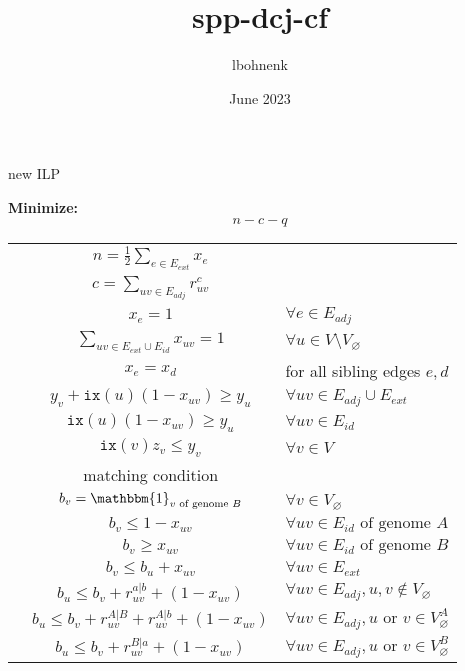 \documentclass{article}[7pt]
\title{spp-dcj-cf}
\author{lbohnenk }
\date{June 2023}
\begin{document}
\newcommand{\extremityedges}{E_{ext}}
\newcommand{\adjacencyedges}{E_{adj}}
\newcommand{\indeledges}{E_{id}}
\newcommand{\idx}[1]{\texttt{ix}(#1)}
\newcommand{\parityvar}{b}
\newcommand{\caps}{V_{\varnothing}}
\newcommand{\trans}{|}
\newcommand{\cis}{\circ}
\newcommand{\coolone}{\mathbbm{1}}

\begin{algorithm}[htb]
\caption{new ILP}
\textbf{Minimize:}
\begin{equation*}
    n - c -q
\end{equation*}

\begin{constraints}

\begin{tabular}{lcl}
    \cns & $n = \frac{1}{2} \sum_{e \in E_{ext}} x_{e}$\\
    \cns & $c = \sum_{uv\in E_{adj}} r^c_{uv}$\\
    \cns & $x_{e} = 1 $ & $\forall e\in \adjacencyedges$\\
     \cns & $\sum_{uv\in E_{ext} \cup E_{id} } x_{uv}= 1$ & $\forall u\in V\setminus V_{\varnothing}$  \\
     \cns & $x_e=x_d$ & for all sibling edges $e,d$\\
     \cns & $y_v + \idx{u}(1-x_{uv}) \geq y_u$ &$\forall uv \in \adjacencyedges\cup \extremityedges$\\
          & $\idx{u}(1-x_{uv})\geq y_u$& $\forall uv \in \indeledges$\\
    \cns & $\idx{v}z_v \leq y_v$ & $\forall v\in V $\\
    \cns & matching condition\\
    \cns & $\parityvar_v = \coolone_{v \text{ of genome } B}$ & $\forall v \in \caps$\\
    \cns & $\parityvar_v \leq 1 - x_{uv}$ & $\forall uv \in \indeledges \text{ of genome } A$\\
     & $\parityvar_v \geq  x_{uv}$ & $\forall uv \in \indeledges \text{ of genome } B$\\
    \cns & $\parityvar_v \leq \parityvar_u +  x_{uv}$& $\forall uv \in \extremityedges$\\
    & $\parityvar_u \leq \parityvar_v + r_{uv}^{a\trans b} + (1-x_{uv})$& $\forall uv\in E_{adj},u,v\notin \caps$\\
    & $\parityvar_u \leq \parityvar_v + r_{uv}^{A\trans B} + r_{uv}^{A\trans b} + (1-x_{uv})$& $\forall uv\in E_{adj}, u \text{ or } v\in \caps^A$\\
    & $\parityvar_u \leq \parityvar_v + r_{uv}^{B\trans a} + (1-x_{uv})$& $\forall uv\in E_{adj}, u \text{ or } v\in \caps^B$\\

\end{tabular}
\end{constraints}
\end{algorithm}
\end{document}
